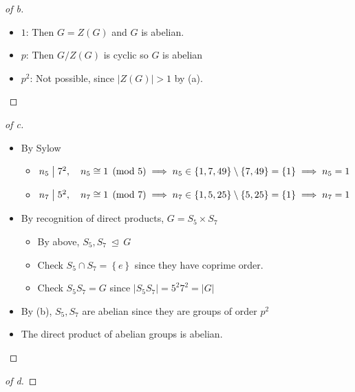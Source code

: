 \begin{solution}
\begin{proof}[of b]
\begin{itemize}
\tightlist
\item
  \(1\): Then \(G = Z(G)\) and \(G\) is abelian.
\item
  \(p\): Then \(G/Z(G)\) is cyclic so \(G\) is abelian
\item
  \(p^2\): Not possible, since \({\left\lvert {Z(G)} \right\rvert} > 1\)
  by (a).
\end{itemize}

\end{proof}

\begin{proof}[of c]

\envlist

\begin{itemize}
\item
  By Sylow

  \begin{itemize}
  \tightlist
  \item
    \(n_5 \bigm|7^2,\quad n_5\cong 1\pmod 5 \implies n_5\in\left\{{1, 7, 49}\right\}\setminus\left\{{7, 49}\right\} = \left\{{1}\right\} \implies n_5 = 1\)
  \item
    \(n_7 \bigm|5^2, \quad n_7 \cong 1 \pmod 7 \implies n_7 \in \left\{{1, 5, 25}\right\}\setminus\left\{{5, 25}\right\} =\left\{{1}\right\} \implies n_7 = 1\)
  \end{itemize}
\item
  By recognition of direct products, \(G = S_5 \times S_7\)

  \begin{itemize}
  \tightlist
  \item
    By above, \(S_5, S_7{~\trianglelefteq~}G\)
  \item
    Check \(S_5\cap S_7 = \left\{{e}\right\}\) since they have coprime
    order.
  \item
    Check \(S_5S_7 = G\) since
    \({\left\lvert {S_5 S_7} \right\rvert} = 5^2 7^2 = {\left\lvert {G} \right\rvert}\)
  \end{itemize}
\item
  By (b), \(S_5, S_7\) are abelian since they are groups of order
  \(p^2\)
\item
  The direct product of abelian groups is abelian.
\end{itemize}

\end{proof}

\begin{proof}[of d]

\envlist


\end{proof}
\end{solution}

